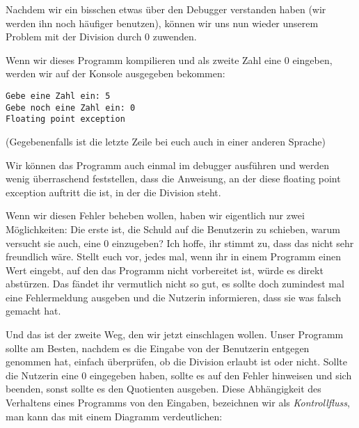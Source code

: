 
Nachdem wir ein bisschen etwas über den Debugger verstanden haben (wir werden
ihn noch häufiger benutzen), können wir uns nun wieder unserem Problem mit der
Division durch 0 zuwenden.


Wenn wir dieses Programm kompilieren und als zweite Zahl eine 0 eingeben,
werden wir auf der Konsole ausgegeben bekommen:
\begin{verbatim}
Gebe eine Zahl ein: 5
Gebe noch eine Zahl ein: 0
Floating point exception
\end{verbatim}
(Gegebenenfalls ist die letzte Zeile bei euch auch in einer anderen Sprache)

Wir können das Programm auch einmal im debugger ausführen und werden wenig
überraschend feststellen, dass die Anweisung, an der diese floating point
exception auftritt die ist, in der die Division steht.

Wenn wir diesen Fehler beheben wollen, haben wir eigentlich nur zwei
Möglichkeiten: Die erste ist, die Schuld auf die Benutzerin zu schieben, warum
versucht sie auch, eine 0 einzugeben? Ich hoffe, ihr stimmt zu, dass das nicht
sehr freundlich wäre. Stellt euch vor, jedes mal, wenn ihr in einem Programm
einen Wert eingebt, auf den das Programm nicht vorbereitet ist, würde es direkt
abstürzen. Das fändet ihr vermutlich nicht so gut, es sollte doch zumindest mal
eine Fehlermeldung ausgeben und die Nutzerin informieren, dass sie was falsch
gemacht hat.

Und das ist der zweite Weg, den wir jetzt einschlagen wollen. Unser Programm
sollte am Besten, nachdem es die Eingabe von der Benutzerin entgegen genommen
hat, einfach überprüfen, ob die Division erlaubt ist oder nicht. Sollte die
Nutzerin eine 0 eingegeben haben, sollte es auf den Fehler hinweisen und sich
beenden, sonst sollte es den Quotienten ausgeben. Diese Abhängigkeit des
Verhaltens eines Programms von den Eingaben, bezeichnen wir als
\emph{Kontrollfluss}, man kann das mit einem Diagramm verdeutlichen:

\begin{center}
\end{center}

